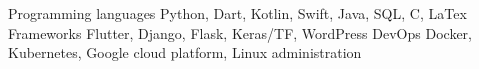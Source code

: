 
\begin{cvskills}
  \cvskill
    {Programming languages} %
    {Python, Dart, Kotlin, Swift, Java, SQL, C, LaTex} %
  \vspace{0.5mm}
  \cvskill
    {Frameworks} %
    {Flutter, Django, Flask, Keras/TF, WordPress} %
  \cvskill
    {DevOps} %
    {Docker, Kubernetes, Google cloud platform, Linux administration} %
\end{cvskills}
